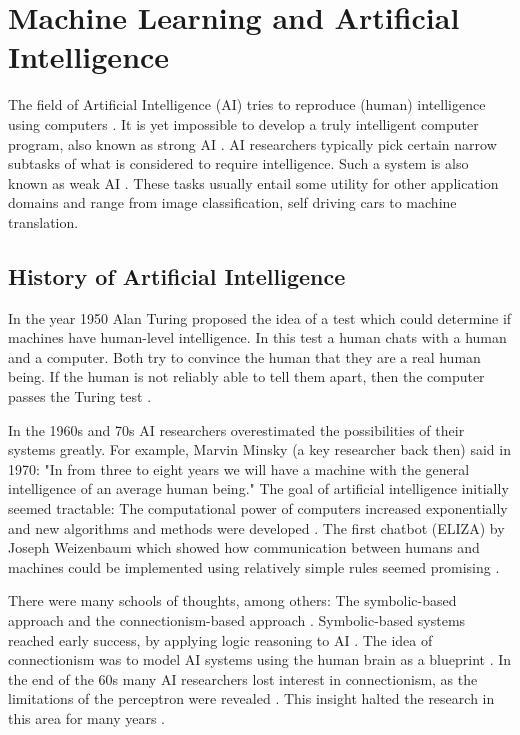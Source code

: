 \documentclass[draft,final,oneside]{vutinfth} %
\begin{document}
\section{Machine Learning and Artificial Intelligence}
The field of Artificial Intelligence (AI) tries to reproduce (human) intelligence using computers \cite{questforai}. It is yet impossible to develop a truly intelligent computer program, also known as strong AI \cite{strongweakai}. AI researchers typically pick certain narrow subtasks of what is considered to require intelligence. Such a system is also known as weak AI \cite{strongweakai}. These tasks usually entail some utility for other application domains and range from image classification, self driving cars to machine translation.

\subsection{History of Artificial Intelligence}

In the year 1950 Alan Turing proposed the idea of a test which could determine if machines have human-level intelligence. In this test a human chats with a human and a computer. Both try to convince the human that they are a real human being. If the human is not reliably able to tell them apart, then the computer passes the Turing test \cite{turingtest}.

In the 1960s and 70s AI researchers overestimated the possibilities of their systems greatly. For example, Marvin Minsky (a key researcher back then) said in 1970: "In from three to eight years we will have a machine with the general intelligence of an average human being." The goal of artificial intelligence initially seemed tractable:
The computational power of computers increased exponentially and new algorithms and methods were developed \cite{mooreslaw}\cite{questforai}. The first chatbot (ELIZA) by Joseph Weizenbaum which showed how communication between humans and machines could be implemented using relatively simple rules seemed promising \cite{weizenbaum1966eliza}.

There were many schools of thoughts, among others: The symbolic-based approach and the connectionism-based approach \cite{machineswhothink}. Symbolic-based systems reached early success, by applying logic reasoning to AI \cite{machineswhothink}. The idea of connectionism was to model AI systems using the human brain as a blueprint \cite{machineswhothink}. In the end of the 60s many AI researchers lost interest in connectionism, as the limitations of the perceptron were revealed \cite{Minsky1969PerceptronsA}. This insight halted the research in this area for many years \cite{questforai}.
\end{document}
